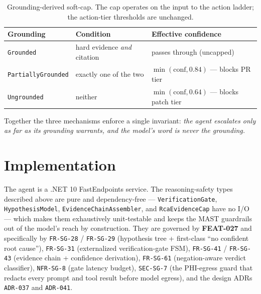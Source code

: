 \documentclass[11pt]{article}
\begin{document}
\begin{table}[ht]
\centering
\caption{Grounding-derived soft-cap. The cap operates on the input to the
action ladder; the action-tier thresholds are unchanged.}
\label{tab:cap}
\begin{tabular}{lll}
\toprule
Grounding & Condition & Effective confidence \\
\midrule
\texttt{Grounded}          & hard evidence \emph{and} citation & passes through (uncapped) \\
\texttt{PartiallyGrounded} & exactly one of the two            & $\min(\textrm{conf}, 0.84)$ --- blocks PR tier \\
\texttt{Ungrounded}        & neither                           & $\min(\textrm{conf}, 0.64)$ --- blocks patch tier \\
\bottomrule
\end{tabular}
\end{table}

Together the three mechanisms enforce a single invariant: \emph{the agent
escalates only as far as its grounding warrants, and the model's word is never
the grounding.}

\section{Implementation}

The agent is a .NET 10 FastEndpoints service. The reasoning-safety types
described above are pure and dependency-free --- \texttt{VerificationGate},
\texttt{HypothesisModel}, \texttt{EvidenceChainAssembler}, and
\texttt{RcaEvidenceCap} have no I/O --- which makes them exhaustively
unit-testable and keeps the MAST guardrails out of the model's reach by
construction. They are governed by \textbf{FEAT-027} and specifically by
\texttt{FR-SG-28} / \texttt{FR-SG-29} (hypothesis tree + first-class ``no
confident root cause''), \texttt{FR-SG-31} (externalized verification-gate
FSM), \texttt{FR-SG-41} / \texttt{FR-SG-43} (evidence chain + confidence
derivation), \texttt{FR-SG-61} (negation-aware verdict classifier),
\texttt{NFR-SG-8} (gate latency budget), \texttt{SEC-SG-7} (the PHI-egress
guard that redacts every prompt and tool result before model egress), and the
design ADRs \texttt{ADR-037} and \texttt{ADR-041}.
\end{document}

